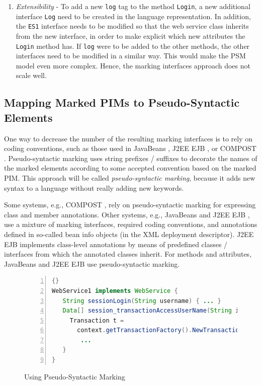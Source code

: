 \begin{enumerate}
\item \textit{Extensibility} - To add a new {\tt log} tag to the method {\tt Login}, a new additional interface {\tt Log} need to be created in the language representation. In addition, the {\tt ES1} interface needs to be modified so that the web service class inherits from the new interface, in order to make explicit which new attributes the {\tt Login} method has. If {\tt log} were to be added to the other methods, the other interfaces need to be modified in a similar way. This would make the PSM model even more complex. Hence, the marking interfaces approach does not scale well. 
\end{enumerate}

\subsection{Mapping Marked PIMs to Pseudo-Syntactic Elements}
\label{ch03.pseudo.syn}

One way to decrease the number of the resulting marking interfaces is to rely on coding conventions, such as those used  in JavaBeans \cite{javabeans}, J2EE EJB \cite{www.j2ee}, or COMPOST \cite{java.compost}. Pseudo-syntactic marking uses string prefixes / suffixes to decorate the names of the marked elements according to some accepted convention based on the marked PIM. This approach will be called \textit{pseudo-syntactic marking}, because it adds new syntax to a language without really adding new keywords. 

Some systems, e.g., COMPOST \cite{java.compost}, rely on pseudo-syntactic marking for expressing class and member annotations. Other systems, e.g., JavaBeans \cite{javabeans} and J2EE EJB \cite{www.j2ee}, use a mixture of marking interfaces, required coding conventions, and annotations defined in so-called bean info objects (in the XML deployment descriptor). J2EE EJB implements class-level annotations by means of predefined classes / interfaces from which the annotated classes inherit. For methods and attributes, JavaBeans and J2EE EJB use pseudo-syntactic marking.
 
\begin{figure}[ht]
\begin{center}
\begin{minipage}[t]{8cm}
	\begin{scriptsize}
\begin{lstlisting}[numbers=left,language=Java,frame=leftline]{}
WebService1 implements WebService {
   String sessionLogin(String username) { ... }
   Data[] session_transactionAccessUserName(String id) {
     Transaction t = 
       context.getTransactionFactory().NewTransaction();
 	    ...
   }
}
\end{lstlisting}
	\end{scriptsize}
	\end{minipage}
\end{center}
	\caption{Using Pseudo-Syntactic Marking}
	\label{fig.pseudo-marking}
\end{figure}

